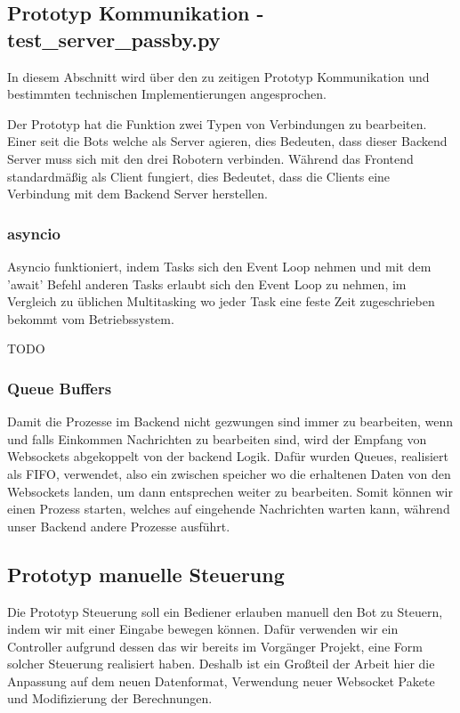 \subsection{Prototyp Kommunikation - test\_server\_passby.py}
In diesem Abschnitt wird über den zu zeitigen Prototyp Kommunikation 
und bestimmten technischen Implementierungen angesprochen.

Der Prototyp hat die Funktion zwei Typen von Verbindungen zu bearbeiten.
Einer seit die Bots welche als Server agieren, 
dies Bedeuten, dass dieser Backend Server muss sich mit den drei Robotern verbinden.
Während das Frontend standardmäßig als Client fungiert, 
dies Bedeutet, dass die Clients eine Verbindung mit dem Backend Server herstellen.


\subsubsection{asyncio}
Asyncio funktioniert, indem Tasks sich den Event Loop nehmen und mit dem 'await' 
Befehl anderen Tasks erlaubt sich den Event Loop zu nehmen, im Vergleich zu üblichen Multitasking
wo jeder Task eine feste Zeit zugeschrieben bekommt vom Betriebssystem.

TODO

\subsubsection{Queue Buffers}
Damit die Prozesse im Backend nicht gezwungen sind immer zu bearbeiten, 
wenn und falls Einkommen Nachrichten zu bearbeiten sind, 
wird der Empfang von Websockets abgekoppelt von der backend Logik.
Dafür wurden Queues, realisiert als FIFO, verwendet, also ein zwischen speicher 
wo die erhaltenen Daten von den Websockets landen, um dann entsprechen weiter zu bearbeiten.
Somit können wir einen Prozess starten, welches auf eingehende Nachrichten warten kann, 
während unser Backend andere Prozesse ausführt.

\subsection{Prototyp manuelle Steuerung}
Die Prototyp Steuerung soll ein Bediener erlauben manuell den Bot zu Steuern,
indem wir mit einer Eingabe bewegen können. 
Dafür verwenden wir ein Controller aufgrund dessen das wir bereits im Vorgänger Projekt,
eine Form solcher Steuerung realisiert haben. 
Deshalb ist ein Großteil der Arbeit hier die Anpassung auf dem neuen Datenformat, 
Verwendung neuer Websocket Pakete und Modifizierung der Berechnungen.

